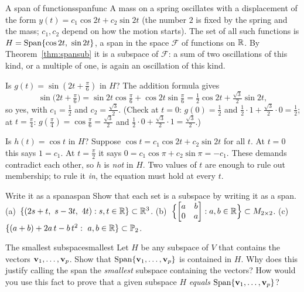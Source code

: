 \documentclass[11pt]{article}
\begin{document}
\begin{exmp}{A span of functions}{spanfunc}
A mass on a spring oscillates with a displacement of the form $y(t)=c_1\cos2t+c_2\sin2t$ (the number $2$ is fixed by the spring and the mass; $c_1,c_2$ depend on how the motion starts). The set of all such functions is $H=\operatorname{Span}\{\cos2t,\ \sin2t\}$, a span in the space $\mathcal{F}$ of functions on $\mathbb{R}$. By Theorem~\ref{thm:spansub} it is a subspace of $\mathcal{F}$: a sum of two oscillations of this kind, or a multiple of one, is again an oscillation of this kind.

Is $g(t)=\sin(2t+\tfrac\pi6)$ in $H$? The addition formula gives
\[
\sin\bigl(2t+\tfrac\pi6\bigr)=\sin2t\cos\tfrac\pi6+\cos2t\sin\tfrac\pi6=\tfrac12\cos2t+\tfrac{\sqrt3}{2}\sin2t,
\]
so yes, with $c_1=\tfrac12$ and $c_2=\tfrac{\sqrt3}2$. (Check at $t=0$: $g(0)=\tfrac12$ and $\tfrac12\cdot1+\tfrac{\sqrt3}2\cdot0=\tfrac12$; at $t=\tfrac\pi4$: $g(\tfrac\pi4)=\cos\tfrac\pi6=\tfrac{\sqrt3}2$ and $\tfrac12\cdot0+\tfrac{\sqrt3}2\cdot1=\tfrac{\sqrt3}2$.)

Is $h(t)=\cos t$ in $H$? Suppose $\cos t=c_1\cos2t+c_2\sin2t$ for all $t$. At $t=0$ this says $1=c_1$. At $t=\tfrac\pi2$ it says $0=c_1\cos\pi+c_2\sin\pi=-c_1$. These demands contradict each other, so $h$ is \emph{not} in $H$. Two values of $t$ are enough to rule out membership; to rule it \emph{in}, the equation must hold at every $t$.
\end{exmp}

\begin{kc}{Write it as a span}{aspan}
Show that each set is a subspace by writing it as a span. (a)~$\{(2s+t,\ s-3t,\ 4t):s,t\in\mathbb{R}\}\subset\mathbb{R}^3$. (b)~$\Bigl\{\begin{bmatrix}a&b\\0&a\end{bmatrix}:a,b\in\mathbb{R}\Bigr\}\subset M_{2\times2}$. (c)~$\{(a+b)+2a\,t-b\,t^2:\ a,b\in\R\}\subset\mathbb{P}_2$.
\end{kc}

\begin{think}{The smallest subspace}{smallest}
Let $H$ be any subspace of $V$ that contains the vectors $\mathbf{v}_1,\dots,\mathbf{v}_p$. Show that $\operatorname{Span}\{\mathbf{v}_1,\dots,\mathbf{v}_p\}$ is contained in $H$. Why does this justify calling the span the \emph{smallest} subspace containing the vectors? How would you use this fact to prove that a given subspace $H$ \emph{equals} $\operatorname{Span}\{\mathbf{v}_1,\dots,\mathbf{v}_p\}$?
\end{think}
\end{document}

